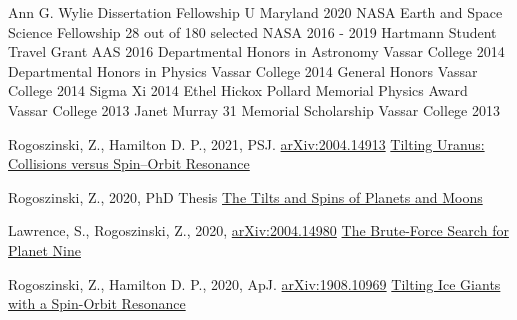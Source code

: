 \documentclass[]{awesome-cv}
\begin{document}
\vspace{-2mm}

\begin{cvhonors}
	\cvhonor
	{Ann G. Wylie Dissertation Fellowship}
	{}
	{U Maryland}
	{2020}
	\cvhonor
	{NASA Earth and Space Science Fellowship}
	{28 out of 180 selected}
	{NASA}
	{2016 - 2019}
	\cvhonor
	{Hartmann Student Travel Grant}
	{}
	{AAS}
	{2016}
	\cvhonor
	{Departmental Honors in Astronomy}
	{}
	{Vassar College}
	{2014}
	\cvhonor
	{Departmental Honors in Physics}
	{}
	{Vassar College}
	{2014}
	\cvhonor
	{General Honors}
	{}
	{Vassar College}
	{2014}
	\cvhonor
	{Sigma Xi}
	{}
	{}
	{2014}
	\cvhonor
	{Ethel Hickox Pollard Memorial Physics Award}
	{}
	{Vassar College}
	{2013}
	\cvhonor
	{Janet Murray \textquotesingle{}31 Memorial Scholarship}
	{}
	{Vassar College}
	{2013}
\end{cvhonors}

\vspace{-2mm}
\begin{cventries}
	\cventry
	{Rogoszinski, Z., Hamilton D. P., 2021, PSJ. \href{https://arxiv.org/pdf/2004.14913.pdf}{arXiv:2004.14913}}
	{\href{https://ui.adsabs.harvard.edu/abs/2020arXiv200414913R/abstract}{Tilting Uranus: Collisions versus Spin--Orbit Resonance}}
	{}
	{}
	{}
	
	
	\vspace{-5mm}
	\cventry
	{Rogoszinski, Z., 2020, PhD Thesis}
	{\href{https://drum.lib.umd.edu/handle/1903/26852}{The Tilts and Spins of Planets and Moons}}
	{}
	{}
	{}
	
	\vspace{-5mm}
	\cventry
	{Lawrence, S., Rogoszinski, Z., 2020, \href{https://arxiv.org/pdf/2004.14980.pdf}{arXiv:2004.14980}}
	{\href{https://ui.adsabs.harvard.edu/abs/2020arXiv200414980L/abstract}{The Brute-Force Search for Planet Nine}}
	{}
	{}
	{}
	
	\vspace{-5mm}
	\cventry
	{Rogoszinski, Z., Hamilton D. P., 2020, ApJ. \href{https://arxiv.org/pdf/1908.10969.pdf}{arXiv:1908.10969}}
	{\href{https://ui.adsabs.harvard.edu/abs/2020ApJ...888...60R/abstract}{Tilting Ice Giants with a Spin-Orbit Resonance}}
	{}
	{}
	{}
	
	\vspace{-6mm}
\end{cventries}
\end{document}
